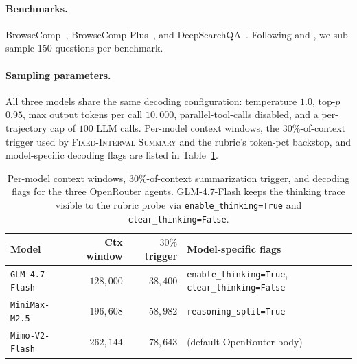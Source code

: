 \documentclass{article}
\begin{document}
\paragraph{Benchmarks.} BrowseComp~\citep{wei2025browsecompsimplechallengingbenchmark},
BrowseComp-Plus~\citep{chen2025BrowseCompPlus}, and
DeepSearchQA~\citep{gupta2026deepsearchqabridgingcomprehensivenessgap}.
Following \citet{sun2025scalinglonghorizonllmagent} and
\citet{lee2026agenticaggregationparallelscaling}, we sub-sample 150
questions per benchmark.

\paragraph{Sampling parameters.} All three models share the same
decoding configuration: temperature $1.0$, top-$p$ $0.95$, max output
tokens per call $10{,}000$, parallel-tool-calls disabled, and a
per-trajectory cap of $100$ LLM calls. Per-model context windows, the
$30\%$-of-context trigger used by \textsc{Fixed-Interval Summary} and
the rubric's token-pct backstop, and model-specific decoding flags are
listed in Table~\ref{tab:search_model_config}.

\begin{table}[h!]
\centering
\small
\caption{Per-model context windows, $30\%$-of-context summarization
trigger, and decoding flags for the three OpenRouter agents.
GLM-4.7-Flash keeps the thinking trace visible to the rubric probe via
\texttt{enable\_thinking=True} and \texttt{clear\_thinking=False}.}
\label{tab:search_model_config}
\setlength{\tabcolsep}{6pt}
\begin{tabular}{lrrl}
\toprule
\textbf{Model} & \textbf{Ctx window} & \textbf{$30\%$ trigger}
& \textbf{Model-specific flags} \\
\midrule
\texttt{GLM-4.7-Flash}  & $128{,}000$ & $38{,}400$
  & \texttt{enable\_thinking=True}, \texttt{clear\_thinking=False} \\
\texttt{MiniMax-M2.5}   & $196{,}608$ & $58{,}982$
  & \texttt{reasoning\_split=True} \\
\texttt{Mimo-V2-Flash}  & $262{,}144$ & $78{,}643$
  & (default OpenRouter body) \\
\bottomrule
\end{tabular}
\end{table}
\end{document}

